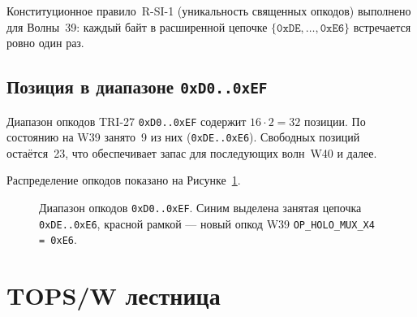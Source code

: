\begin{corollary}[R-SI-1 для W39]
\label{cor:r-si-1-w39}
Конституционное правило~R-SI-1 (уникальность священных опкодов)
выполнено для Волны~39: каждый байт в расширенной цепочке
$\{\texttt{0xDE},\ldots,\texttt{0xE6}\}$ встречается ровно один раз.
\end{corollary}

\subsection{Позиция в диапазоне \texttt{0xD0..0xEF}}
\label{subsec:glava85-opcode-range}

Диапазон опкодов TRI-27 \texttt{0xD0..0xEF} содержит
$16 \cdot 2 = 32$ позиции.
По состоянию на W39 занято~9 из них (\texttt{0xDE..0xE6}).
Свободных позиций остаётся~23, что обеспечивает запас для
последующих волн~W40 и далее.

Распределение опкодов показано на Рисунке~\ref{fig:opcode-range}.

\begin{figure}[ht]
\centering
{}
\caption{Диапазон опкодов \texttt{0xD0..0xEF}. Синим выделена
занятая цепочка \texttt{0xDE..0xE6}, красной рамкой — новый
опкод W39 \texttt{OP\_HOLO\_MUX\_X4 = 0xE6}.}
\label{fig:opcode-range}
\end{figure}

\section{TOPS/W лестница}
\label{sec:glava85-tops-ladder}

